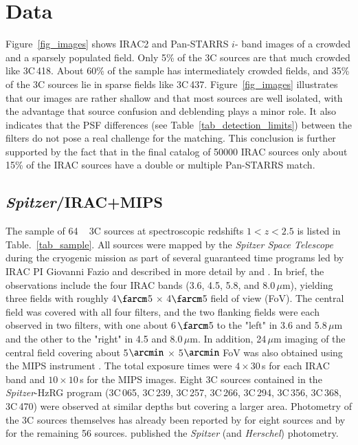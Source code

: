 \documentclass[mathleft,fleqn,%
]{an}
\begin{document}
\section{Data} \label{sec:data}

Figure~\ref{fig_images} shows IRAC2 and Pan-STARRS $i$- band images of
a crowded and a sparsely populated field. Only 5\% of the 3C sources are
that much crowded like 3C\,418. About 60\% of the sample has intermediately
crowded fields, and  35\% of the 3C sources lie in sparse fields like 3C\,437. 
Figure~\ref{fig_images} illustrates that our images are rather shallow and that most
sources are well isolated, with the advantage that source confusion
and deblending plays a minor role. 
It also indicates that the PSF differences (see Table~\ref{tab_detection_limits})
between the filters do not pose a real challenge for the matching. 
This conclusion is further
supported by the fact that in the final catalog of 50000 IRAC sources only
about 15\% of the IRAC sources have a double or multiple Pan-STARRS match. 



\subsection{{\it Spitzer}/IRAC+MIPS} \label{sec:data_spitzer}

The sample of 64 ~ 3C sources at spectroscopic redshifts $1<z<2.5$ 
is listed in Table.~\ref{tab_sample}. All sources were mapped
by the {\it Spitzer Space Telescope} during the cryogenic mission as part of several guaranteed time 
programs led by IRAC PI Giovanni Fazio
and described in more detail by \citet{Seymour07} and \citet{Haas08}. 
In brief, the observations include the four IRAC bands 
(3.6, 4.5, 5.8, and 8.0\,$\mu$m), yielding three fields with roughly 
4$\farcm$5 $\times$ 4$\farcm$5 field of view (FoV).  The central
field was covered with all four filters, and the two flanking fields 
were each observed in two filters, with
one about 6\,$\farcm$5 to the "left" in 3.6 and 5.8\,$\mu$m and the 
other to the "right" in 4.5 and 8.0\,$\mu$m.
In addition, 24\,$\mu$m 
imaging of the central field covering about
5$\arcmin$ $\times$ 5$\arcmin$ FoV was also obtained using the MIPS instrument \citep{Rieke04}. 
The total exposure times were $4 \times 30$\,s for each IRAC band and
$10 \times 10$\,s for the MIPS images. Eight 3C sources contained in the {\it
  Spitzer}-HzRG program  
(3C\,065, 3C\,239, 3C\,257, 3C\,266, 3C\,294, 3C\,356, 3C\,368, 3C\,470) 
were observed at similar depths but covering a larger area. 
Photometry of the 3C sources themselves has already been reported 
by \citet{Seymour07} for 
eight sources and by \citet{Haas08} for the remaining 56 sources. 
\citet{Podigachoski15} published the
{\it Spitzer} (and {\it Herschel}) photometry.
\end{document}
